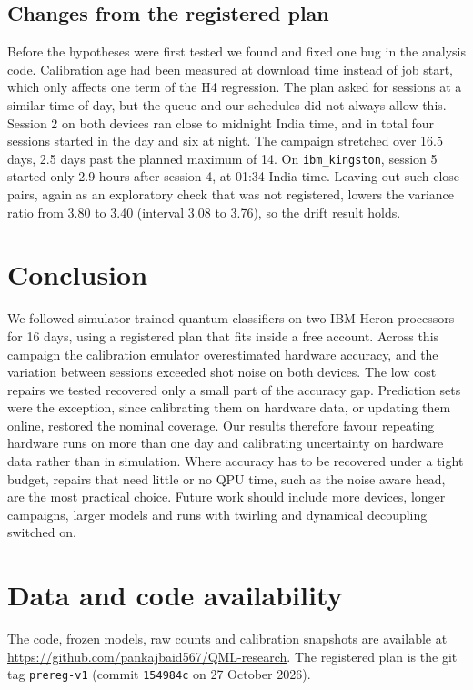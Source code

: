 \documentclass[10pt,conference]{IEEEtran}
\begin{document}
\subsection{Changes from the registered plan}
Before the hypotheses were first tested we found and fixed one bug in the analysis code.
Calibration age had been measured at download time instead of job start, which only affects one
term of the H4 regression. The plan asked for sessions at a similar time of day, but the queue and our schedules did not always allow this. Session 2 on both devices ran close to midnight India
time, and in total four sessions started in the day and six at night. The campaign stretched over
16.5 days, 2.5 days past the planned maximum of 14. On \texttt{ibm\_kingston}, session 5 started
only 2.9 hours after session 4, at 01:34 India time. Leaving out such close pairs, again as an exploratory check that was not registered, lowers the
variance ratio from 3.80 to 3.40 (interval 3.08 to 3.76), so the drift result holds.

\section{Conclusion}
We followed simulator trained quantum classifiers on two IBM Heron processors for 16 days, using a
registered plan that fits inside a free account. Across this campaign the calibration emulator overestimated hardware accuracy, and the variation
between sessions exceeded shot noise on both devices. The low cost repairs we tested recovered only
a small part of the accuracy gap. Prediction sets were the exception, since calibrating them on
hardware data, or updating them online, restored the nominal coverage. Our results therefore
favour repeating hardware runs on more than one day and calibrating uncertainty on hardware data
rather than in simulation. Where accuracy has to be recovered under a tight budget, repairs that
need little or no QPU time, such as the noise aware head, are the most practical choice. Future work should include more devices, longer campaigns, larger models and runs with twirling and dynamical
decoupling switched on.

\section*{Data and code availability}
The code, frozen models, raw counts and calibration snapshots are available at
\url{https://github.com/pankajbaid567/QML-research}. The registered plan is the git tag
\texttt{prereg-v1} (commit \texttt{154984c} on 27 October 2026).
\end{document}
